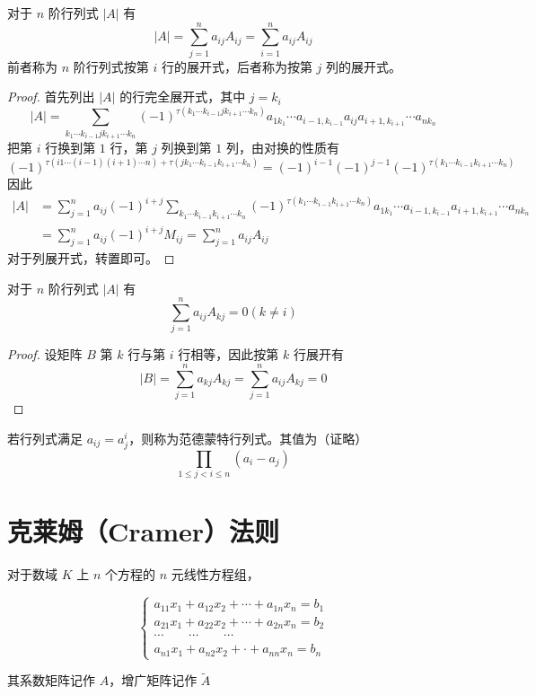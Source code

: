 \begin{theorem}
	对于 $n$ 阶行列式 $|A|$ 有
	$$|A| = \sum_{j=1}^na_{ij}A_{ij} = \sum_{i=1}^na_{ij}A_{ij}$$
	前者称为 $n$ 阶行列式按第 $i$ 行的展开式，后者称为按第 $j$ 列的展开式。
\end{theorem}

\begin{proof}
	首先列出 $|A|$ 的行完全展开式，其中 $j=k_i$
	$$|A|=\sum_{k_1\cdots k_{i-1}jk_{i+1}\cdots k_n}(-1)^{\tau(k_1\cdots k_{i-1}jk_{i+1}\cdots k_n)}a_{1k_1}\cdots a_{i-1,k_{i-1}}a_{ij}a_{i+1,k_{i+1}}\cdots a_{nk_n}$$
	把第 $i$ 行换到第 $1$ 行，第 $j$ 列换到第 $1$ 列，由对换的性质有
	$$(-1)^{\tau(i1\cdots (i-1)(i+1)\cdots n)+\tau(jk_1\cdots k_{i-1}k_{i+1}\cdots k_n)}=(-1)^{i-1}(-1)^{j-1}(-1)^{\tau(k_1\cdots k_{i-1}k_{i+1}\cdots k_n)}$$
	因此
	\begin{equation*}
		\begin{aligned}
			|A|&=\sum_{j=1}^na_{ij}(-1)^{i+j}\sum_{k_1\cdots k_{i-1}k_{i+1}\cdots k_n}(-1)^{\tau(k_1\cdots k_{i-1}k_{i+1}\cdots k_n)}a_{1k_1}\cdots a_{i-1,k_{i-1}}a_{i+1,k_{i+1}}\cdots a_{nk_n}\\
			&=\sum_{j=1}^na_{ij}(-1)^{i+j}M_{ij}=\sum_{j=1}^na_{ij}A_{ij}
		\end{aligned}
	\end{equation*}
	对于列展开式，转置即可。
\end{proof}

\begin{theorem}
	对于 $n$ 阶行列式 $|A|$ 有
	$$\sum_{j=1}^na_{ij}A_{kj} = 0(k\ne i)$$
\end{theorem}

\begin{proof}
	设矩阵 $B$ 第 $k$ 行与第 $i$ 行相等，因此按第 $k$ 行展开有
	$$|B|=\sum_{j=1}^na_{kj}A_{kj}=\sum_{j=1}^na_{ij}A_{kj}=0$$
\end{proof}

\begin{definition}
	 若行列式满足 $a_{ij} = a_j^i$，则称为范德蒙特行列式。其值为（证略）
	 $$\prod_{1\leqslant j < i \leqslant n}(a_i-a_j)$$
\end{definition}

\section{克莱姆（Cramer）法则}

对于数域 $K$ 上 $n$ 个方程的 $n$ 元线性方程组，

\begin{equation*}
	\left\{
		\begin{matrix}
			a_{11}x_1+a_{12}x_2+\cdots+a_{1n}x_n=b_1\\
			a_{21}x_1+a_{22}x_2+\cdots+a_{2n}x_n=b_2\\
			\cdots\qquad\cdots\qquad\cdots\\
			a_{n1}x_1+a_{n2}x_2+\cdot +a_{nn}x_n=b_n
		\end{matrix}
	\right.
\end{equation*}

其系数矩阵记作 $A$，增广矩阵记作 $\widetilde{A}$ 